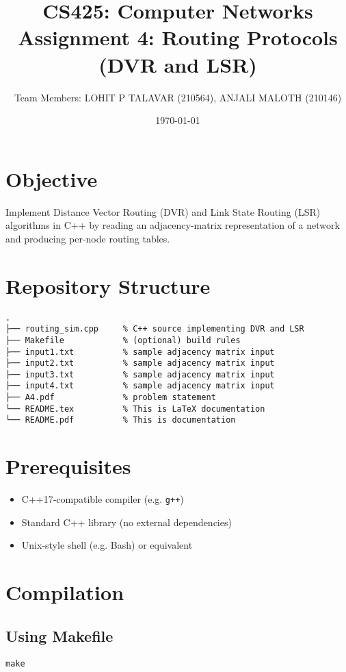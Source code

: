\documentclass[12pt]{article}
\title{CS425: Computer Networks\\Assignment 4: Routing Protocols (DVR and LSR)}
\author{Team Members: LOHIT P TALAVAR (210564), ANJALI MALOTH (210146)}
\date{\today}
\begin{document}
\maketitle

\section*{Objective}
Implement Distance Vector Routing (DVR) and Link State Routing (LSR) algorithms in C++ by reading an adjacency‐matrix representation of a network and producing per‐node routing tables.

\section*{Repository Structure}
\begin{verbatim}
.
├── routing_sim.cpp     % C++ source implementing DVR and LSR
├── Makefile            % (optional) build rules
├── input1.txt          % sample adjacency matrix input
├── input2.txt          % sample adjacency matrix input
├── input3.txt          % sample adjacency matrix input
├── input4.txt          % sample adjacency matrix input
├── A4.pdf              % problem statement
└── README.tex          % This is LaTeX documentation
└── README.pdf          % This is documentation
\end{verbatim}

\section*{Prerequisites}
\begin{itemize}
  \item C++17‑compatible compiler (e.g. \texttt{g++})
  \item Standard C++ library (no external dependencies)
  \item Unix‑style shell (e.g. Bash) or equivalent
\end{itemize}

\newpage

\section*{Compilation}
\subsection*{Using Makefile}
\begin{verbatim}
make
\end{verbatim}
\end{document}
